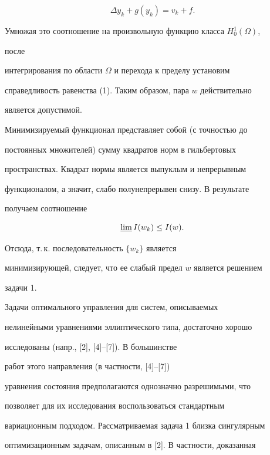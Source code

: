 \begin{pf}
$$ 


\Delta y_k+g(y_k)=v_k+f. 


$$ 


Умножая это соотношение на произвольную функцию класса $H^1_0(\Omega)$, 


после 


интегрирования по области $\Omega$ и перехода к пределу установим 


справедливость равенства (1). Таким образом, пара $w$ действительно 


является допустимой. 


 


Минимизируемый функционал представляет собой (с точностью до 


постоянных множителей) сумму квадратов норм в гильбертовых 


пространствах. Квадрат нормы является выпуклым и непрерывным 


функционалом, а значит, слабо полунепрерывен снизу. В результате 


получаем соотношение 


$$ 


\varliminf I(w_k)\le I(w). 


$$ 


Отсюда, т.\,к. последовательность $\{w_k\}$ является 


минимизирующей, следует, что ее слабый предел $w$ является решением 


задачи 1. 


\end{pf} 


 


 


Задачи оптимального управления для систем, описываемых 


нелинейными уравнениями эллиптического типа, достаточно хорошо 


исследованы (напр., [2], [4]--[7]). В большинстве 


работ этого направления (в частности, [4]--[7]) 


уравнения состояния предполагаются однозначно разрешимыми, что 


позволяет для их исследования воспользоваться стандартным 


вариационным подходом. Рассматриваемая задача 1 близка сингулярным 


оптимизационным задачам, описанным в [2]. В частности, доказанная 


